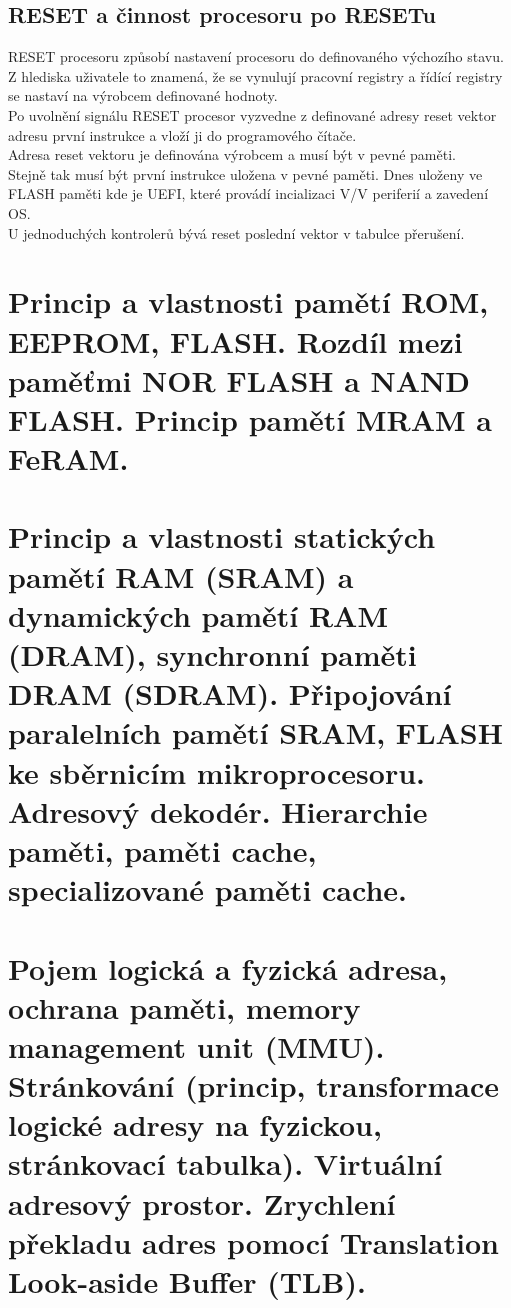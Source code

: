 \subsection{RESET a činnost procesoru po RESETu}
RESET procesoru způsobí nastavení procesoru do definovaného výchozího stavu.\\
Z hlediska uživatele to znamená, že se vynulují pracovní registry a řídící registry se nastaví na výrobcem definované hodnoty.\\
Po uvolnění signálu RESET procesor vyzvedne z definované adresy reset vektor adresu první instrukce a vloží ji do programového čítače.\\
Adresa reset vektoru je definována výrobcem a musí být v pevné paměti.\\
Stejně tak musí být první instrukce uložena v pevné paměti. Dnes uloženy ve FLASH paměti kde je UEFI, které provádí incializaci V/V periferií a zavedení OS.\\
U jednoduchých kontrolerů bývá reset poslední vektor v tabulce přerušení.\\

\section{Princip a vlastnosti pamětí ROM, EEPROM, FLASH. Rozdíl mezi paměťmi NOR FLASH a NAND FLASH. Princip pamětí MRAM a FeRAM.}

\section{Princip a vlastnosti statických pamětí RAM (SRAM) a dynamických pamětí RAM (DRAM), synchronní paměti DRAM (SDRAM).
  Připojování paralelních pamětí SRAM, FLASH ke sběrnicím mikroprocesoru. Adresový dekodér.
  Hierarchie paměti, paměti cache, specializované paměti cache.}

\section{Pojem logická a fyzická adresa, ochrana paměti, memory management unit (MMU). Stránkování (princip, transformace logické adresy na fyzickou, stránkovací tabulka). Virtuální adresový prostor. Zrychlení překladu adres pomocí Translation Look-aside Buffer (TLB).}